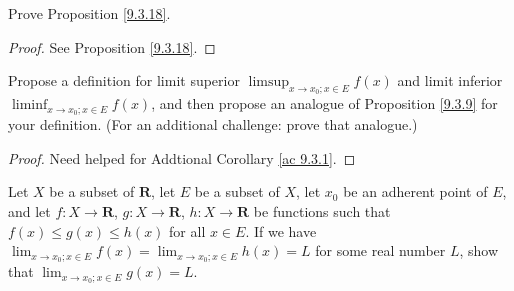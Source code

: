 \begin{exercise}\label{ex 9.3.3}
    Prove Proposition \ref{9.3.18}.
\end{exercise}

\begin{proof}
    See Proposition \ref{9.3.18}.
\end{proof}

\begin{exercise}\label{ex 9.3.4}
    Propose a definition for limit superior \(\limsup_{x \to x_0 ; x \in E} f(x)\) and limit inferior \(\liminf_{x \to x_0 ; x \in E} f(x)\), and then propose an analogue of Proposition \ref{9.3.9} for your definition.
    (For an additional challenge: prove that analogue.)
\end{exercise}

\begin{proof}
    Need helped for Addtional Corollary \ref{ac 9.3.1}.
\end{proof}

\begin{exercise}\label{ex 9.3.5}
    Let \(X\) be a subset of \(\mathbf{R}\), let \(E\) be a subset of \(X\), let \(x_0\) be an adherent point of \(E\), and let \(f : X \to \mathbf{R}\), \(g : X \to \mathbf{R}\), \(h : X \to \mathbf{R}\) be functions such that \(f(x) \leq g(x) \leq h(x)\) for all \(x \in E\).
    If we have \(\lim_{x \to x_0 ; x \in E} f(x) = \lim_{x \to x_0 ; x \in E} h(x) = L\) for some real number \(L\), show that \(\lim_{x \to x_0 ; x \in E} g(x) = L\).
\end{exercise}

